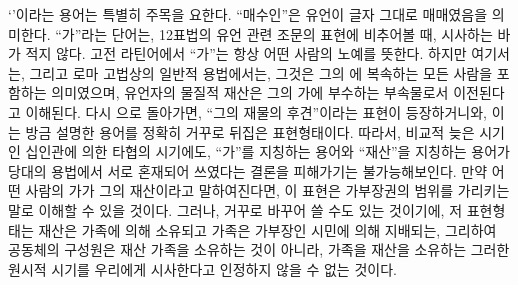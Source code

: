 `'이라는 용어는 특별히 주목을 요한다.
``매수인''은 유언이 글자 그대로 매매였음을 의미한다.
``가''라는 단어는,
12표법의 유언 관련 조문의 표현에 비추어볼 때,
시사하는 바가 적지 않다.
고전 라틴어에서 ``가''는 항상 어떤 사람의 노예를 뜻한다.
하지만 여기서는, 그리고 로마 고법상의 일반적 용법에서는,
그것은 그의 에 복속하는 모든 사람을 포함하는 의미였으며,
유언자의 물질적 재산은 그의 가에 부수하는 부속물로서
이전된다고 이해된다.
다시 으로 돌아가면, ``그의 재물의 후견''이라는
표현이 등장하거니와, 이는 방금 설명한 용어를 정확히 거꾸로 뒤집은 표현형태이다.
따라서,
비교적 늦은 시기인
십인관에 의한 타협의 시기에도,
``가''를 지칭하는 용어와 ``재산''을 지칭하는 용어가 당대의 용법에서
서로 혼재되어 쓰였다는
결론을 피해가기는 불가능해보인다.
만약 어떤 사람의 가가 그의 재산이라고 말하여진다면,
이 표현은 가부장권의 범위를 가리키는 말로 이해할 수 있을 것이다.
그러나, 거꾸로 바꾸어 쓸 수도 있는 것이기에,
저 표현형태는
재산은 가족에 의해 소유되고 가족은 가부장인 시민에 의해 지배되는,
그리하여 공동체의 구성원은 재산 가족을 소유하는 것이 아니라,
가족을  재산을 소유하는
그러한 원시적 시기를 우리에게 시사한다고
인정하지 않을 수 없는 것이다.

